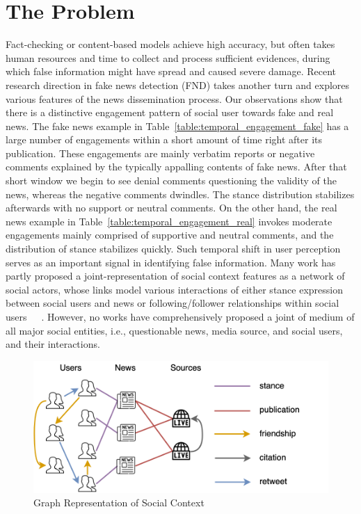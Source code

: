 \documentclass[fyp]{socreport}
\theoremstyle{definition}
\theoremstyle{hypothesis}
\begin{document}
\section{The Problem}
Fact-checking or content-based models achieve high accuracy, but often takes human resources and time to collect and process sufficient evidences, during which false information might have spread and caused severe damage. Recent research direction 
in fake news detection (FND) takes another turn and explores various features of the news dissemination process. Our observations show that there is a distinctive engagement pattern of social user towards fake and real news. 
The fake news example in Table~\ref{table:temporal_engagement_fake} has a large number of engagements within a short amount of time right after its publication. These engagements are mainly verbatim reports or negative comments explained by the typically appalling contents of fake news. After that short window we begin to see denial comments questioning the validity of the news, whereas the negative comments dwindles. The stance distribution stabilizes afterwards with no support or neutral comments. On the other hand, the real news example in Table~\ref{table:temporal_engagement_real} invokes moderate engagements mainly comprised of supportive and neutral comments, and the distribution of stance stabilizes quickly. Such temporal shift in user perception serves as an important signal in identifying false information. Many work has partly proposed a joint-representation of social context features as a network of social actors, whose links model various interactions of either stance expression between social users and news or following/follower relationships within social users~\cite{jin2014news}~\cite{gupta2012evaluating}\cite{popat2017truth}~\cite{shu2019beyond}. However, no works have comprehensively proposed a joint of medium of all major social entities, i.e., questionable news, media source, and social users, and their interactions. 

\begin{figure}[t]
\centering
\includegraphics[scale=0.5]{social_graph_final.png}
\caption{Graph Representation of Social Context}
\label{fig:social_graph}
\end{figure}
\end{document}
